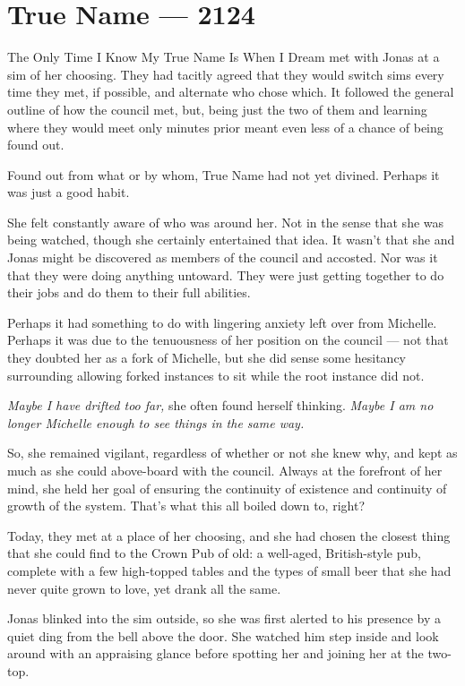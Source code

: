 \hypertarget{true-name-2124}{%
\chapter{True Name — 2124}\label{true-name-2124}}

The Only Time I Know My True Name Is When I Dream met with Jonas at a sim of her choosing. They had tacitly agreed that they would switch sims every time they met, if possible, and alternate who chose which. It followed the general outline of how the council met, but, being just the two of them and learning where they would meet only minutes prior meant even less of a chance of being found out.

Found out from what or by whom, True Name had not yet divined. Perhaps it was just a good habit.

She felt constantly aware of who was around her. Not in the sense that she was being watched, though she certainly entertained that idea. It wasn't that she and Jonas might be discovered as members of the council and accosted. Nor was it that they were doing anything untoward. They were just getting together to do their jobs and do them to their full abilities.

Perhaps it had something to do with lingering anxiety left over from Michelle. Perhaps it was due to the tenuousness of her position on the council — not that they doubted her as a fork of Michelle, but she did sense some hesitancy surrounding allowing forked instances to sit while the root instance did not.

\emph{Maybe I have drifted too far,} she often found herself thinking. \emph{Maybe I am no longer Michelle enough to see things in the same way.}

So, she remained vigilant, regardless of whether or not she knew why, and kept as much as she could above-board with the council. Always at the forefront of her mind, she held her goal of ensuring the continuity of existence and continuity of growth of the system. That's what this all boiled down to, right?

Today, they met at a place of her choosing, and she had chosen the closest thing that she could find to the Crown Pub of old: a well-aged, British-style pub, complete with a few high-topped tables and the types of small beer that she had never quite grown to love, yet drank all the same.

Jonas blinked into the sim outside, so she was first alerted to his presence by a quiet ding from the bell above the door. She watched him step inside and look around with an appraising glance before spotting her and joining her at the two-top.

